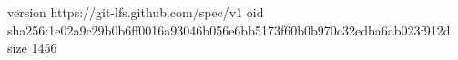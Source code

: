 version https://git-lfs.github.com/spec/v1
oid sha256:1e02a9c29b0b6ff0016a93046b056e6bb5173f60b0b970c32edba6ab023f912d
size 1456
